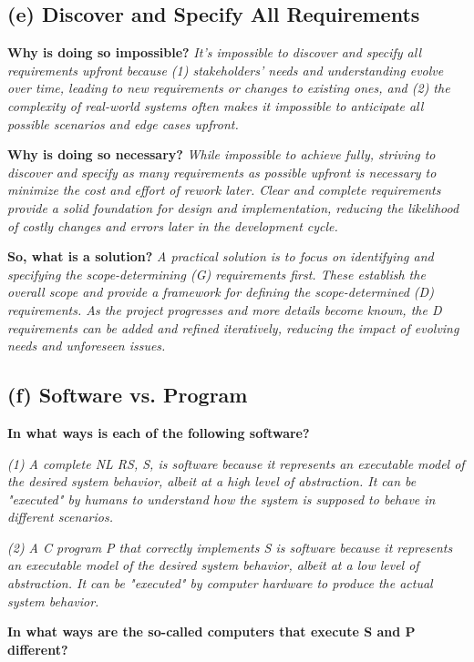 \documentclass{article}
\begin{document}
\subsection*{(e) Discover and Specify All Requirements}

\textbf{Why is doing so impossible?} \textit{It's impossible to discover and specify all requirements upfront because (1) stakeholders' needs and understanding evolve over time, leading to new requirements or changes to existing ones, and (2) the complexity of real-world systems often makes it impossible to anticipate all possible scenarios and edge cases upfront.}

\textbf{Why is doing so necessary?} \textit{While impossible to achieve fully, striving to discover and specify as many requirements as possible upfront is necessary to minimize the cost and effort of rework later. Clear and complete requirements provide a solid foundation for design and implementation, reducing the likelihood of costly changes and errors later in the development cycle.}

\textbf{So, what is a solution?} \textit{A practical solution is to focus on identifying and specifying the scope-determining (G) requirements first. These establish the overall scope and provide a framework for defining the scope-determined (D) requirements. As the project progresses and more details become known, the D requirements can be added and refined iteratively, reducing the impact of evolving needs and unforeseen issues.}

\subsection*{(f) Software vs. Program}

\textbf{In what ways is each of the following software?}

\textit{(1) A complete NL RS, S, is software because it represents an executable model of the desired system behavior, albeit at a high level of abstraction. It can be "executed" by humans to understand how the system is supposed to behave in different scenarios.}

\textit{(2) A C program P that correctly implements S is software because it represents an executable model of the desired system behavior, albeit at a low level of abstraction. It can be "executed" by computer hardware to produce the actual system behavior.}

\textbf{In what ways are the so-called computers that execute S and P different?}
\end{document}
